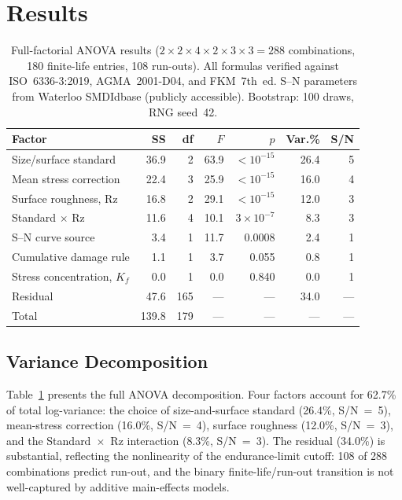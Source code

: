 \documentclass[12pt,a4paper]{article}
\begin{document}
\section{Results}
\label{sec:results}

\begin{table}[h]
\centering
\caption{Full-factorial ANOVA results ($2\times2\times4\times2\times3\times3 =
288$ combinations, 180 finite-life entries, 108 run-outs).
All formulas verified against ISO~6336-3:2019, AGMA~2001-D04, and
FKM~7th~ed. S--N parameters from Waterloo SMDIdbase (publicly accessible).
Bootstrap: 100 draws, RNG seed~42.}
\label{tab:anova}
\begin{tabular}{lrrrrrr}
\toprule
Factor & SS & df & $F$ & $p$ & Var.\% & S/N \\
\midrule
Size/surface standard & 36.9 & 2 & 63.9 & $<10^{-15}$ & 26.4 & 5 \\
Mean stress correction & 22.4 & 3 & 25.9 & $<10^{-15}$ & 16.0 & 4 \\
Surface roughness, Rz & 16.8 & 2 & 29.1 & $<10^{-15}$ & 12.0 & 3 \\
Standard $\times$ Rz & 11.6 & 4 & 10.1 & $3\times10^{-7}$ & 8.3 & 3 \\
S--N curve source & 3.4 & 1 & 11.7 & 0.0008 & 2.4 & 1 \\
Cumulative damage rule & 1.1 & 1 & 3.7 & 0.055 & 0.8 & 1 \\
Stress concentration, $K_f$ & 0.0 & 1 & 0.0 & 0.840 & 0.0 & 1 \\
\midrule
Residual & 47.6 & 165 & --- & --- & 34.0 & --- \\
Total & 139.8 & 179 & --- & --- & --- & --- \\
\bottomrule
\end{tabular}
\end{table}

\subsection{Variance Decomposition}

Table~\ref{tab:anova} presents the full ANOVA decomposition. Four factors
account for 62.7\% of total log-variance: the choice of size-and-surface
standard (26.4\%, S/N~=~5), mean-stress correction (16.0\%, S/N~=~4),
surface roughness (12.0\%, S/N~=~3), and the Standard~$\times$~Rz
interaction (8.3\%, S/N~=~3). The residual (34.0\%) is substantial,
reflecting the nonlinearity of the endurance-limit cutoff: 108 of 288
combinations predict run-out, and the binary finite-life/run-out
transition is not well-captured by additive main-effects models.
\end{document}

